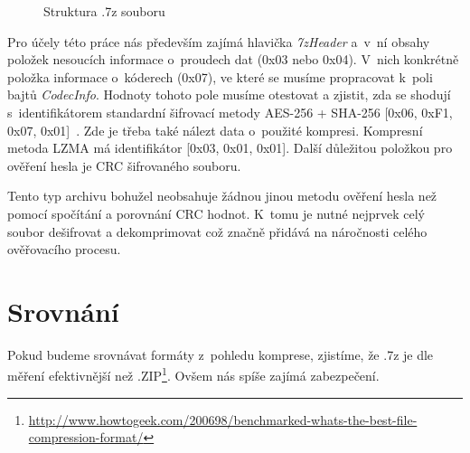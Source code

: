 \begin{figure}[ht]
    \begin{center}
    \end{center}
    \caption{Struktura .7z souboru \cite{Pavlov:2015}}
    \label{7zstruct}
\end{figure}
Pro účely této práce nás především zajímá hlavička {\it 7zHeader} a~v~ní obsahy položek nesoucích
informace o~proudech dat (0x03 nebo 0x04). V~nich konkrétně položka informace o~kóderech (0x07),
ve které se musíme propracovat k~poli bajtů {\it CodecInfo}. Hodnoty tohoto pole musíme otestovat
a zjistit, zda se shodují s~identifikátorem standardní šifrovací metody AES-256 + SHA-256
[0x06, 0xF1, 0x07, 0x01]~\cite{Pavlov:2015}. Zde je třeba také nálezt data o~použité kompresi.
Kompresní metoda LZMA má identifikátor [0x03, 0x01, 0x01]. Další důležitou položkou pro ověření hesla je CRC šifrovaného souboru. 

Tento typ archivu bohužel neobsahuje žádnou jinou metodu ověření hesla než pomocí spočítání a
porovnání CRC hodnot. K~tomu je nutné nejprvek celý soubor dešifrovat a dekomprimovat což značně
přidává na náročnosti celého ověřovacího procesu.

\section{Srovnání}
Pokud budeme srovnávat formáty z~pohledu komprese, zjistíme, že .7z je dle měření efektivnější
než
.ZIP\footnote{\url{http://www.howtogeek.com/200698/benchmarked-whats-the-best-file-compression-format/}}. Ovšem nás spíše zajímá zabezpečení.

